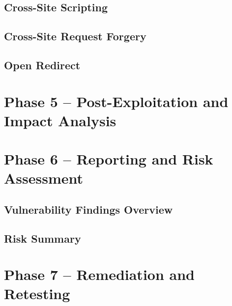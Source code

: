 \documentclass[11pt,a4paper]{report}
\begin{document}
\section{Cross-Site Scripting}


\section{Cross-Site Request Forgery}


\section{Open Redirect}



\chapter{Phase 5 -- Post-Exploitation and Impact Analysis}
\label{chap:phase5}



\chapter{Phase 6 -- Reporting and Risk Assessment}
\label{chap:phase6}

\section{Vulnerability Findings Overview}


\section{Risk Summary}



\chapter{Phase 7 -- Remediation and Retesting}
\label{chap:phase7}
\end{document}
